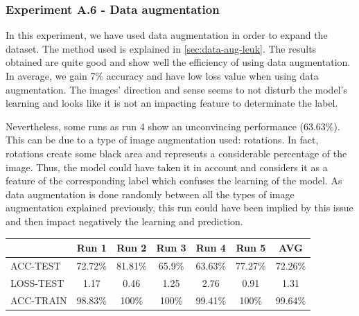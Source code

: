 \documentclass[11pt, openany]{report}
\theoremstyle{plain}
\theoremstyle{definition}
\theoremstyle{remark}
\begin{document}
\subsubsection{Experiment A.6 - Data augmentation}

In this experiment, we have used data augmentation in order to expand the dataset. The method used is explained in \autoref{sec:data-aug-leuk}. The results obtained are quite good and show well the efficiency of using data augmentation. In average, we gain 7\% accuracy and have low loss value when using data augmentation. The images' direction and sense seems to not disturb the model's learning and looks like it is not an impacting feature to determinate the label. 

Nevertheless, some runs as run 4 show an unconvincing performance (63.63\%). This can be due to a type of image augmentation used: rotations. In fact, rotations create some black area and represents a considerable percentage of the image. Thus, the model could have taken it in account and considers it as a feature of the corresponding label which confuses the learning of the model. As data augmentation is done randomly between all the types of image augmentation explained previously, this run could have been implied by this issue and then impact negatively the learning and prediction.     

\begin{center}
\begin{tabular}{|l|c|c|c|c|c|c|}
  \hline
   & \textbf{Run 1} & \textbf{Run 2} & \textbf{Run 3} & \textbf{Run 4} & \textbf{Run 5} & \textbf{AVG}\\
  \hline
  ACC-TEST & 72.72\% & 81.81\% & 65.9\% & 63.63\% & 77.27\% & 72.26\% \\
  LOSS-TEST & 1.17 & 0.46 & 1.25 & 2.76  & 0.91 & 1.31 \\ 
  ACC-TRAIN & 98.83\% & 100\% & 100\% & 99.41\% & 100\% & 99.64\% \\ 
  \hline
\end{tabular}
\label{table:results-A6}
\end{center}
\end{document}
